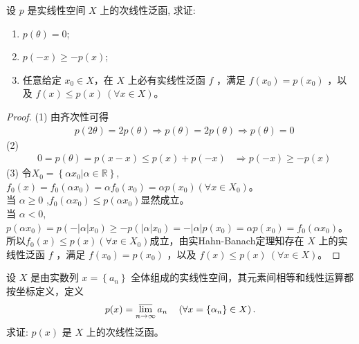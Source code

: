 \documentclass[lang=cn,newtx,10pt,scheme=chinese,thmcnt=chapter]{elegantbook}
\begin{document}
\begin{problem}
设 $p$ 是实线性空间 ${X}$ 上的次线性泛函, 求证:
\begin{enumerate}
    \item $p(\theta)=0$;
    \item $p(-x) \geqslant -p(x)$;
    \item 任意给定 $x_0 \in {X}$，在 ${X}$ 上必有实线性泛函 $f$ ，满足 $f\left(x_0\right)=p\left(x_0\right)$ ，以及 $f(x) \leqslant p(x) \ (\forall x \in {X})$。
\end{enumerate}
\end{problem}
\begin{proof}
(1) 由齐次性可得
\begin{equation*}
\begin{aligned}
& p(2 \theta)=2 p(\theta) \Rightarrow p(\theta)=2 p(\theta)  \Rightarrow p(\theta)=0
\end{aligned}
\end{equation*}
(2)
\begin{equation*}
\begin{aligned}
& 0=p(\theta)=p(x-x) \leqslant p(x)+p(-x) 
& \Rightarrow p(-x) \geqslant-p(x)
\end{aligned}
\end{equation*}
(3) 令${X}_0=\left\{\alpha x_0|\alpha\in\mathbb{R}\right\}$,$f_0(x)=f_0\left(\alpha x_0\right)=\alpha f_0\left(x_0\right)=\alpha p\left(x_0\right)(\forall x\in{X}_0)$。\\
当  $\alpha \geqslant 0$ ,$f_0\left(\alpha x_0\right) \leqslant p\left(\alpha x_0\right) $显然成立。\\
当 $\alpha<0$,$ p\left(\alpha x_0\right)=p\left(-|\alpha| x_0\right) \geqslant-p\left(|\alpha| x_0\right)  =-|\alpha| p\left(x_0\right)=\alpha p\left(x_0\right)=f_0\left(\alpha x_0\right)$。\\
所以$f_0(x)\leqslant p(x)(\forall x\in {X}_0)$成立，由实Hahn-Banach定理知存在 ${X}$ 上的实线性泛函 $f$ ，满足 $f\left(x_0\right)=p\left(x_0\right)$ ，以及 $f(x) \leqslant p(x) \ (\forall x \in {X})$。
\end{proof}
\begin{problem}
设 ${X}$ 是由实数列 $x =\left\{a_n\right\}$ 全体组成的实线性空间，其元素间相等和线性运算都按坐标定义，定义
\[
p(x)=\varlimsup_{n \rightarrow \infty} a_n \quad\left(\forall x=\left\{\alpha_n\right\} \in {X} \right) .
\]
求证: $p(x)$ 是 ${X}$ 上的次线性泛函。
\end{problem}
\end{document}
